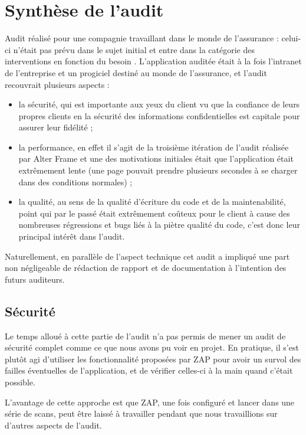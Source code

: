 \section{Synthèse de l'audit}
\label{sec:synthese_audit}
Audit réalisé pour une compagnie travaillant dans le monde de l'assurance : celui-ci n'était pas prévu dans le sujet initial et entre dans la catégorie des \og interventions en fonction du besoin \fg{}. L'application auditée était à la fois l'intranet de l'entreprise et un progiciel destiné au monde de l'assurance, et l'audit recouvrait plusieurs aspects :
\begin{itemize}
  \item la sécurité, qui est importante aux yeux du client vu que la confiance de leurs propres clients en la sécurité des informations confidentielles est capitale pour assurer leur fidélité ;
  \item la performance, en effet il s'agit de la troisième itération de l'audit réalisée par Alter Frame et une des motivations initiales était que l'application était extrêmement lente (une page pouvait prendre plusieurs secondes à se charger dans des conditions normales) ;
  \item la qualité, au sens de la qualité d'écriture du code et de la maintenabilité, point qui par le passé était extrêmement coûteux pour le client à cause des nombreuses régressions et bugs liés à la piètre qualité du code, c'est donc leur principal intérêt dans l'audit. 
\end{itemize}

Naturellement, en parallèle de l'aspect technique cet audit a impliqué une part non négligeable de rédaction de rapport et de documentation à l'intention des futurs auditeurs.

\subsection{Sécurité}
Le temps alloué à cette partie de l'audit n'a pas permis de mener un audit de sécurité complet comme ce que nous avons pu voir en projet. En pratique, il s'est plutôt agi d'utiliser les fonctionnalité proposées par ZAP pour avoir un survol des failles éventuelles de l'application, et de vérifier celles-ci \og à la main \fg{} quand c'était possible. 

L'avantage de cette approche est que ZAP, une fois configuré et lancer dans une série de scans, peut être laissé à travailler pendant que nous travaillions sur d'autres aspects de l'audit. 

